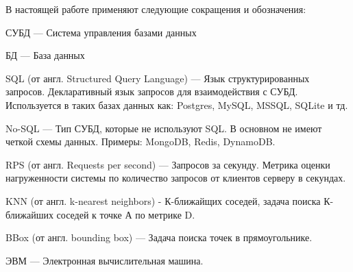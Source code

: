 \Abbreviations %
В настоящей работе применяют следующие сокращения и обозначения:

\noindent СУБД --- Система управления базами данных

\noindent БД --- База данных

\noindent SQL (от англ. Structured Query Language) --- Язык структурированных запросов. Декларативный язык запросов для взаимодействия с СУБД. Используется в таких базах данных как: Postgres, MySQL, MSSQL, SQLite и тд.

\noindent No-SQL --- Тип СУБД, которые не используют SQL. В основном не имеют четкой схемы данных. Примеры: MongoDB, Redis, DynamoDB.

\noindent RPS (от англ. Requests per second) --- Запросов за секунду. Метрика оценки нагруженности системы по количество запросов от клиентов серверу в секундах.

\noindent KNN (от англ. k-nearest neighbors) - К-ближайщих соседей, задача поиска К-ближайших соседей к точке А по метрике D. 

\noindent BBox (от англ. bounding box) --- Задача поиска точек в прямоугольнике.

\noindent ЭВМ --- Электронная вычислительная машина.

